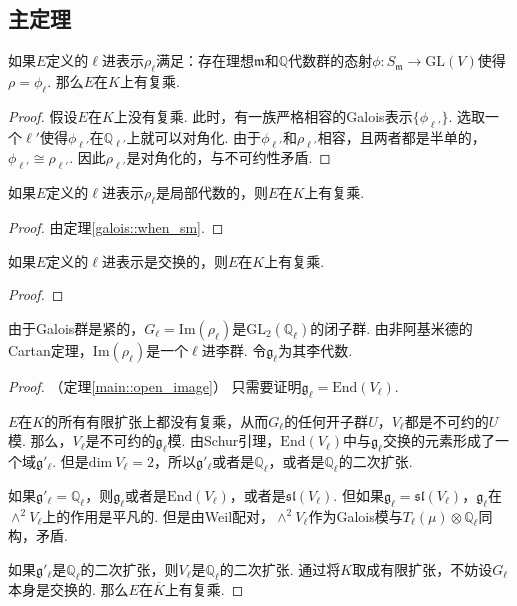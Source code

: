 \subsection{主定理}

\begin{cthm}
    如果$E$定义的$\ell$进表示$\rho_{\ell}$满足：存在理想$\mathfrak{m}$和$\mathbb{Q}$代数群的态射$\phi: S_{\mathfrak{m}}\to \mathrm{GL}(V)$使得$\rho = \phi_{\ell}$. 那么$E$在$K$上有复乘.
\end{cthm}

\begin{proof}
    假设$E$在$K$上没有复乘. 此时，有一族严格相容的Galois表示$\{\phi_{\ell'}\}$. 选取一个$\ell'$使得$\phi_{\ell'}$在$\mathbb{Q}_{\ell'}$上就可以对角化. 由于$\phi_{\ell'}$和$\rho_{\ell'}$相容，且两者都是半单的，$\phi_{\ell'}\cong \rho_{\ell'}$. 因此$\rho_{\ell'}$是对角化的，与不可约性矛盾.
\end{proof}

\begin{cthm}
    如果$E$定义的$\ell$进表示$\rho_{\ell}$是局部代数的，则$E$在$K$上有复乘. \label{reps::when_cm}
\end{cthm}

\begin{proof}
    由定理\ref{galois::when_sm}. 
\end{proof}

\begin{ccor}
    如果$E$定义的$\ell$进表示是交换的，则$E$在$K$上有复乘.
\end{ccor}

\begin{proof}
\end{proof}

由于Galois群是紧的，$G_{\ell} = \mathrm{Im}(\rho_\ell)$是$\mathrm{GL}_2(\mathbb{Q}_{\ell})$的闭子群. 由非阿基米德的Cartan定理，$\mathrm{Im}(\rho_{\ell})$是一个$\ell$进李群. 令$\mathfrak{g}_{\ell}$为其李代数.

\begin{proof}
    （定理\ref{main::open_image}）
    只需要证明$\mathfrak{g}_{\ell} = \mathrm{End}(V_{\ell})$.

    $E$在$K$的所有有限扩张上都没有复乘，从而$G_{\ell}$的任何开子群$U$，$V_{\ell}$都是不可约的$U$模. 那么，$V_{\ell}$是不可约的$\mathfrak{g}_{\ell}$模. 由Schur引理，$\mathrm{End}(V_{\ell})$中与$\mathfrak{g}_{\ell}$交换的元素形成了一个域$\mathfrak{g}'_{\ell}$. 但是$\mathrm{dim}\ V_{\ell}=2$，所以$\mathfrak{g}'_{\ell}$或者是$\mathbb{Q}_{\ell}$，或者是$\mathbb{Q}_{\ell}$的二次扩张.

    如果$\mathfrak{g}'_{\ell} = \mathbb{Q}_{\ell}$，则$\mathfrak{g}_{\ell}$或者是$\mathrm{End}(V_{\ell})$，或者是$\mathfrak{sl}(V_{\ell})$. 但如果$\mathfrak{g}_{\ell} = \mathfrak{sl}(V_{\ell})$，$\mathfrak{g}_{\ell}$在$\wedge^2 V_{\ell}$上的作用是平凡的. 但是由Weil配对，$\wedge^2 V_{\ell}$作为Galois模与$T_{\ell}(\mu)\otimes \mathbb{Q}_{\ell}$同构，矛盾.

    如果$\mathfrak{g}'_{\ell}$是$\mathbb{Q}_{\ell}$的二次扩张，则$V_{\ell}$是$\mathbb{Q}_{\ell}$的二次扩张. 通过将$K$取成有限扩张，不妨设$G_{\ell}$本身是交换的.
    那么$E$在$\overline{K}$上有复乘.

\end{proof}
